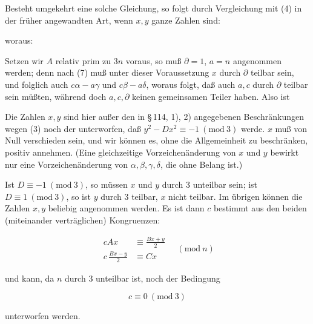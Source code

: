 
Besteht umgekehrt eine solche Gleichung, so folgt durch Vergleichung
mit (4) in der früher angewandten Art, wenn $x, y$ ganze Zahlen sind:


woraus:


Setzen wir $A$ relativ prim zu $3n$ voraus, so muß $\partial = 1$,
$a = n$ angenommen werden; denn nach (7) muß unter dieser
Voraussetzung $x$ durch $\partial$ teilbar sein, und folglich auch
$c\alpha-a\gamma$ und $c\beta-a\delta$, woraus folgt, daß auch $a, c$
durch $\partial$ teilbar sein müßten, während doch $a, c, \partial$
keinen gemeinsamen Teiler haben. Also ist


Die Zahlen $x, y$ sind hier außer den in \S\,114, 1), 2) angegebenen
Beschränkungen wegen (3) noch der unterworfen, daß
$y^2-Dx^2 \equiv -1\ (\mathrm{mod}\ 3)$ werde.  $x$ muß von Null
verschieden sein, und wir können es, ohne die Allgemeinheit zu
beschränken, positiv annehmen. (Eine gleichzeitige
Vorzeichenänderung von $x$ und $y$ bewirkt nur eine
Vorzeichenänderung von $\alpha, \beta, \gamma, \delta$, die ohne
Belang ist.)

Ist $D \equiv -1\ (\mathrm{mod}\ 3)$, so müssen $x$ und $y$ durch 3
unteilbar sein; ist $D \equiv 1\ (\mathrm{mod}\ 3)$, so ist $y$ durch
3 teilbar, $x$ nicht teilbar. Im übrigen können die Zahlen $x, y$
beliebig angenommen werden. Es ist dann $c$ bestimmt aus den beiden
(miteinander verträglichen) Kongruenzen:

\[
\begin{aligned}
cAx &\equiv \frac{Bx+y}{2} \\[4pt]
c\,\frac{Bx-y}{2} &\equiv Cx
\end{aligned}
\quad (\mathrm{mod}\ n)
\]

und kann, da $n$ durch 3 unteilbar ist, noch der Bedingung

\[
c \equiv 0\ (\mathrm{mod}\ 3)
\]

unterworfen werden.
